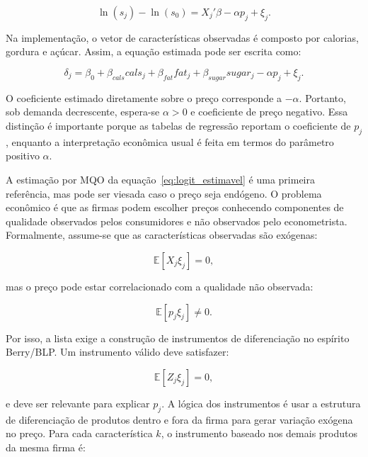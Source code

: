 \documentclass[12pt,a4paper]{article}
\begin{document}
\begin{equation}
    \ln(s_j)
    -
    \ln(s_0)
    =
    X_j'\beta
    -
    \alpha p_j
    +
    \xi_j.
    \label{eq:logit_estimavel}
\end{equation}

Na implementação, o vetor de características observadas é composto por calorias, gordura e açúcar. Assim, a equação estimada pode ser escrita como:

\begin{equation}
    \delta_j
    =
    \beta_0
    +
    \beta_{cals}cals_j
    +
    \beta_{fat}fat_j
    +
    \beta_{sugar}sugar_j
    -
    \alpha p_j
    +
    \xi_j.
    \label{eq:logit_aplicado}
\end{equation}

O coeficiente estimado diretamente sobre o preço corresponde a \(-\alpha\). Portanto, sob demanda decrescente, espera-se \(\alpha>0\) e coeficiente de preço negativo. Essa distinção é importante porque as tabelas de regressão reportam o coeficiente de \(p_j\), enquanto a interpretação econômica usual é feita em termos do parâmetro positivo \(\alpha\).

A estimação por MQO da equação~\eqref{eq:logit_estimavel} é uma primeira referência, mas pode ser viesada caso o preço seja endógeno. O problema econômico é que as firmas podem escolher preços conhecendo componentes de qualidade observados pelos consumidores e não observados pelo econometrista. Formalmente, assume-se que as características observadas são exógenas:

\begin{equation}
   \mathbb{E}[X_j\xi_j]=0,
    \label{eq:exogeneidade_x}
\end{equation}

mas o preço pode estar correlacionado com a qualidade não observada:

\begin{equation}
    \mathbb{E}[p_j\xi_j]\neq 0.
    \label{eq:endogeneidade_preco}
\end{equation}

Por isso, a lista exige a construção de instrumentos de diferenciação no espírito Berry/BLP. Um instrumento válido deve satisfazer:

\begin{equation}
    \mathbb{E}[Z_j\xi_j]=0,
    \label{eq:condicao_iv}
\end{equation}

e deve ser relevante para explicar \(p_j\). A lógica dos instrumentos é usar a estrutura de diferenciação de produtos dentro e fora da firma para gerar variação exógena no preço. Para cada característica \(k\), o instrumento baseado nos demais produtos da mesma firma é:
\end{document}
